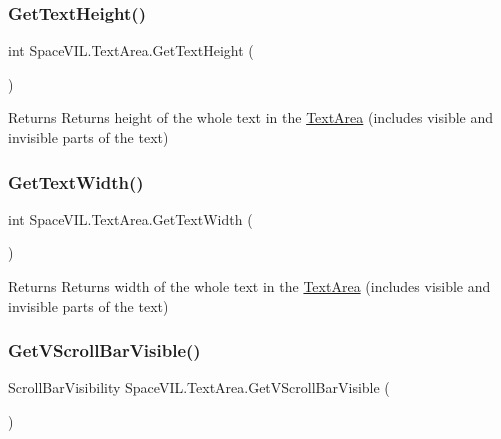 \subsubsection{\texorpdfstring{Get\+Text\+Height()}{GetTextHeight()}}
{\footnotesize\ttfamily int Space\+V\+I\+L.\+Text\+Area.\+Get\+Text\+Height (\begin{DoxyParamCaption}{ }\end{DoxyParamCaption})}

\begin{DoxyReturn}{Returns}
Returns height of the whole text in the \mbox{\hyperlink{class_space_v_i_l_1_1_text_area}{Text\+Area}} (includes visible and invisible parts of the text) 
\end{DoxyReturn}
\mbox{\label{class_space_v_i_l_1_1_text_area_a19980d0c54de49f002d4ab25361ace48}} 
\subsubsection{\texorpdfstring{Get\+Text\+Width()}{GetTextWidth()}}
{\footnotesize\ttfamily int Space\+V\+I\+L.\+Text\+Area.\+Get\+Text\+Width (\begin{DoxyParamCaption}{ }\end{DoxyParamCaption})}

\begin{DoxyReturn}{Returns}
Returns width of the whole text in the \mbox{\hyperlink{class_space_v_i_l_1_1_text_area}{Text\+Area}} (includes visible and invisible parts of the text) 
\end{DoxyReturn}
\mbox{\label{class_space_v_i_l_1_1_text_area_a431947482c1e18238219b5e14801b99f}} 
\subsubsection{\texorpdfstring{Get\+V\+Scroll\+Bar\+Visible()}{GetVScrollBarVisible()}}
{\footnotesize\ttfamily Scroll\+Bar\+Visibility Space\+V\+I\+L.\+Text\+Area.\+Get\+V\+Scroll\+Bar\+Visible (\begin{DoxyParamCaption}{ }\end{DoxyParamCaption})}



